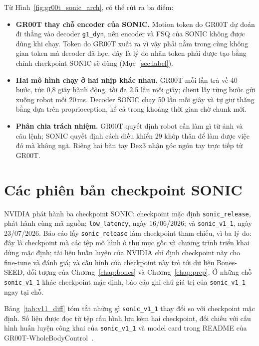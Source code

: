 \documentclass[12pt,a4paper,oneside]{report}
\newcommand{\code}[1]{\texttt{#1}}
\begin{document}
Từ Hình~\ref{fig:gr00t_sonic_arch}, có thể rút ra ba điểm:
\begin{itemize}
\item \textbf{GR00T thay chỗ encoder của SONIC.} Motion token do GR00T dự đoán đi thẳng vào decoder \code{g1\_dyn}, nên encoder và FSQ của SONIC không được dùng khi chạy. Token do GR00T xuất ra vì vậy phải nằm trong cùng không gian token mà decoder đã học, đây là lý do nhãn token phải được tạo bằng chính checkpoint SONIC sẽ dùng (Mục~\ref{sec:label}).
\item \textbf{Hai mô hình chạy ở hai nhịp khác nhau.} GR00T mỗi lần trả về 40 bước, tức 0,8 giây hành động, tối đa 2,5 lần mỗi giây; client lấy từng bước gửi xuống robot mỗi 20\,ms. Decoder SONIC chạy 50 lần mỗi giây và tự giữ thăng bằng dựa trên proprioception, kể cả trong khoảng thời gian chờ chunk mới.
\item \textbf{Phân chia trách nhiệm.} GR00T quyết định robot cần làm gì từ ảnh và câu lệnh; SONIC quyết định cách điều khiển 29 khớp thân để làm được việc đó mà không ngã. Riêng hai bàn tay Dex3 nhận góc ngón tay trực tiếp từ GR00T.
\end{itemize}

\section{Các phiên bản checkpoint SONIC}
\label{sec:intro_versions}

NVIDIA phát hành ba checkpoint SONIC: checkpoint mặc định \code{sonic\_release}, phát hành cùng mã nguồn; \code{low\_latency}, ngày 16/06/2026; và \code{sonic\_v1\_1}, ngày 23/07/2026. Báo cáo lấy \code{sonic\_release} làm checkpoint tham chiếu, vì ba lý do: đây là checkpoint mà các tệp mô hình ở thư mục gốc và chương trình triển khai dùng mặc định; tài liệu huấn luyện của NVIDIA chỉ định checkpoint này cho fine-tune và đánh giá; và cấu hình của checkpoint này trỏ tới dữ liệu Bones-SEED, đối tượng của Chương~\ref{chap:bones} và Chương~\ref{chap:prep}. Ở những chỗ \code{sonic\_v1\_1} khác checkpoint mặc định, báo cáo ghi chú giá trị của \code{sonic\_v1\_1} ngay tại chỗ.

Bảng~\ref{tab:v11_diff} tóm tắt những gì \code{sonic\_v1\_1} thay đổi so với checkpoint mặc định. Số liệu được đọc từ tệp cấu hình lưu kèm hai checkpoint, đối chiếu với cấu hình huấn luyện công khai của \code{sonic\_v1\_1} và model card trong README của GR00T-WholeBodyControl~\cite{wbc}.
\end{document}
